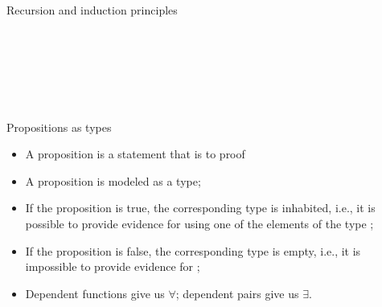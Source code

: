 \documentclass[11pt]{beamer}
\newcommand{\red}[1]{{\color{red}{#1}}}
\newcommand{\blue}[1]{{\color{blue}{#1}}}
\begin{document}
\begin{frame}{Recursion and induction principles}
\begin{code}
\>[13]\<%
\\
\>[2]\<[4]%
\>[4] \<[9]%
\>[9]\<%
\\
\>[4]\<[6]%
\>[6]   \AgdaSymbol{(} \AgdaSymbol{:} \AgdaSymbol{)}  \AgdaSymbol{(} \AgdaSymbol{:} \AgdaSymbol{)}    \AgdaSymbol{(}  \AgdaSymbol{)}   \AgdaSymbol{(}  \AgdaSymbol{)} \AgdaSymbol{)}\<%
\\
\>[4]\<[6]%
\>[6]    \<%
\\
\>[4]\<[6]%
\>[6]      \<%
\\
\>\<\end{code}

\end{frame}

\begin{frame}{Propositions as types}
\vfill
\begin{itemize}
\vfill\item A proposition is a statement that is \red{susceptible} to proof

\vfill\item A proposition \blue{$P$} is modeled as a type;

\vfill\item If the proposition is true, the corresponding type is inhabited,
i.e., it is possible to provide evidence for \blue{$P$} using one of the
elements of the type \blue{$P$}; 

\vfill\item If the proposition is false, the corresponding type is empty,
i.e., it is impossible to provide evidence for \blue{$P$};

\vfill\item Dependent functions give us $\forall$; dependent pairs give us
$\exists$.

\end{itemize}
\vfill
\end{frame}
\end{document}

